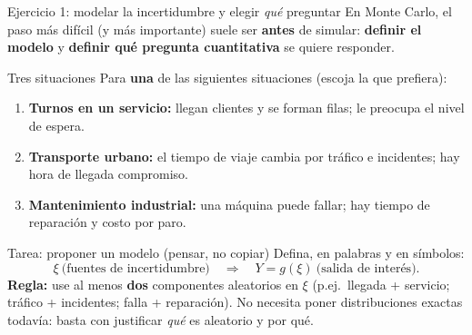 \documentclass[aspectratio=1610, 9pt]{beamer}
\begin{document}
\begin{frame}{Ejercicio 1: modelar la incertidumbre y elegir \emph{qué} preguntar}
\small
En Monte Carlo, el paso más difícil (y más importante) suele ser \textbf{antes} de simular:
\textbf{definir el modelo} y \textbf{definir qué pregunta cuantitativa} se quiere responder.

\begin{block}{Tres situaciones}
Para \textbf{una} de las siguientes situaciones (escoja la que prefiera):
\begin{enumerate}
  \item \textbf{Turnos en un servicio:} llegan clientes y se forman filas; le preocupa el nivel de espera.
  \item \textbf{Transporte urbano:} el tiempo de viaje cambia por tráfico e incidentes; hay hora de llegada compromiso.
  \item \textbf{Mantenimiento industrial:} una máquina puede fallar; hay tiempo de reparación y costo por paro.
\end{enumerate}
\end{block}

\begin{block}{Tarea: proponer un modelo (pensar, no copiar)}
Defina, en palabras y en símbolos:
\[
\xi\ \text{(fuentes de incertidumbre)}\quad\Rightarrow\quad Y=g(\xi)\ \text{(salida de interés)}.
\]
\textbf{Regla:} use al menos \textbf{dos} componentes aleatorios en $\xi$ (p.ej.\ llegada + servicio; tráfico + incidentes; falla + reparación).
No necesita poner distribuciones exactas todavía: basta con justificar \emph{qué} es aleatorio y por qué.
\end{block}

\end{frame}
\end{document}

